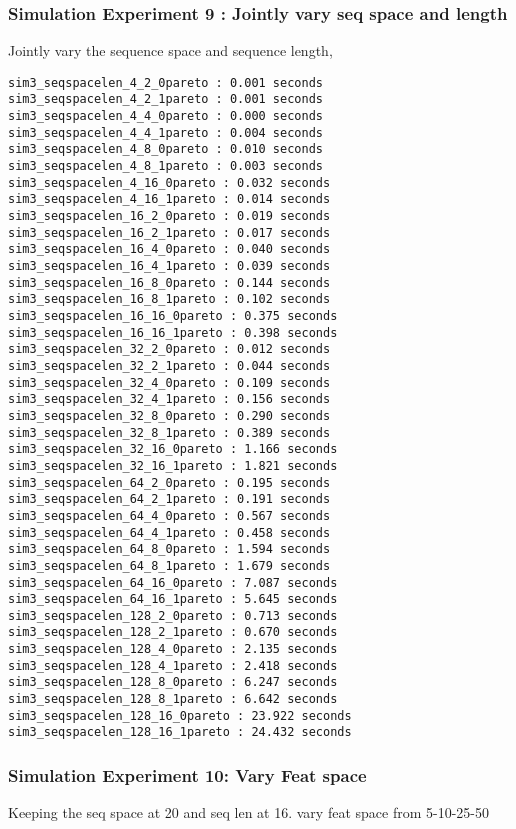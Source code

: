 \subsubsection{Simulation Experiment 9 : Jointly vary seq space and length}
\label{sim:seqspacelen}
Jointly vary the sequence space and sequence length, 
\begin{verbatim}
sim3_seqspacelen_4_2_0pareto : 0.001 seconds
sim3_seqspacelen_4_2_1pareto : 0.001 seconds
sim3_seqspacelen_4_4_0pareto : 0.000 seconds
sim3_seqspacelen_4_4_1pareto : 0.004 seconds
sim3_seqspacelen_4_8_0pareto : 0.010 seconds
sim3_seqspacelen_4_8_1pareto : 0.003 seconds
sim3_seqspacelen_4_16_0pareto : 0.032 seconds
sim3_seqspacelen_4_16_1pareto : 0.014 seconds
sim3_seqspacelen_16_2_0pareto : 0.019 seconds
sim3_seqspacelen_16_2_1pareto : 0.017 seconds
sim3_seqspacelen_16_4_0pareto : 0.040 seconds
sim3_seqspacelen_16_4_1pareto : 0.039 seconds
sim3_seqspacelen_16_8_0pareto : 0.144 seconds
sim3_seqspacelen_16_8_1pareto : 0.102 seconds
sim3_seqspacelen_16_16_0pareto : 0.375 seconds
sim3_seqspacelen_16_16_1pareto : 0.398 seconds
sim3_seqspacelen_32_2_0pareto : 0.012 seconds
sim3_seqspacelen_32_2_1pareto : 0.044 seconds
sim3_seqspacelen_32_4_0pareto : 0.109 seconds
sim3_seqspacelen_32_4_1pareto : 0.156 seconds
sim3_seqspacelen_32_8_0pareto : 0.290 seconds
sim3_seqspacelen_32_8_1pareto : 0.389 seconds
sim3_seqspacelen_32_16_0pareto : 1.166 seconds
sim3_seqspacelen_32_16_1pareto : 1.821 seconds
sim3_seqspacelen_64_2_0pareto : 0.195 seconds
sim3_seqspacelen_64_2_1pareto : 0.191 seconds
sim3_seqspacelen_64_4_0pareto : 0.567 seconds
sim3_seqspacelen_64_4_1pareto : 0.458 seconds
sim3_seqspacelen_64_8_0pareto : 1.594 seconds
sim3_seqspacelen_64_8_1pareto : 1.679 seconds
sim3_seqspacelen_64_16_0pareto : 7.087 seconds
sim3_seqspacelen_64_16_1pareto : 5.645 seconds
sim3_seqspacelen_128_2_0pareto : 0.713 seconds
sim3_seqspacelen_128_2_1pareto : 0.670 seconds
sim3_seqspacelen_128_4_0pareto : 2.135 seconds
sim3_seqspacelen_128_4_1pareto : 2.418 seconds
sim3_seqspacelen_128_8_0pareto : 6.247 seconds
sim3_seqspacelen_128_8_1pareto : 6.642 seconds
sim3_seqspacelen_128_16_0pareto : 23.922 seconds
sim3_seqspacelen_128_16_1pareto : 24.432 seconds
\end{verbatim}

\subsubsection{Simulation Experiment 10: Vary Feat space }
\label{sim:featspace}
Keeping the seq space at 20 and seq len at 16. vary feat space from 5-10-25-50


